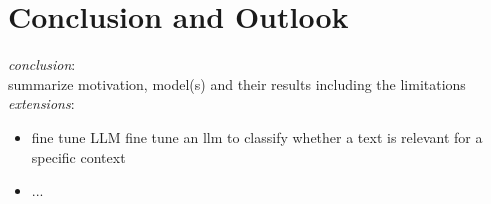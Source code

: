 \chapter{Conclusion and Outlook}\label{sec6}
\thispagestyle{empty}

\textit{conclusion}: \\
summarize motivation, model(s) and their results including the limitations \\

\noindent
\textit{extensions}:
\begin{itemize}
	\item fine tune LLM fine tune an llm to classify whether a text is relevant for a specific context
	\item ...
\end{itemize}





\cleardoublepage
